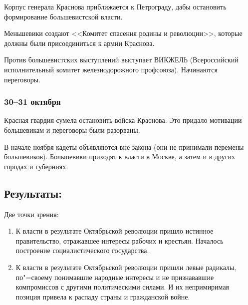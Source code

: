Корпус генерала Краснова приближается к Петрограду, дабы остановить формирование большевистской власти.

Меньшевики создают <<Комитет спасения родины и революции>>, которые должны были присоединиться к армии Краснова.

Против большевистских выступлений выступает ВИКЖЕЛЬ (Всероссийский исполнительный комитет железнодорожного профсоюза). Начинаются переговоры.

\subsubsection{\textbf{30--31 октября}}


Красная гвардия сумела остановить войска Краснова. Это придало мотивации большевикам и переговоры были разорваны.

В начале ноября кадеты объявляются вне закона (они не принимали перемены большевиков). Большевики приходят к власти в Москве, а затем и в других городах и губерниях.

\subsection{Результаты:}

Две точки зрения:

\begin{enumerate}
    \item К власти в результате Октябрьской революции пришло истинное правительство, отражавшее интересы рабочих и крестьян. Началось построение социалистического государства.
    \item К власти в результате Октябрьской революции пришли левые радикалы, по"=своему понимавшие народные интересы и не признававшие компромиссов с другими политическими силами. И их непримиримая позиция привела к распаду страны и гражданской войне.
\end{enumerate}
